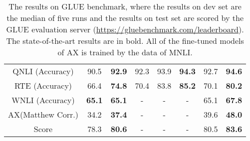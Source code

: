 \documentclass[letterpaper]{article} \usepackage{aaai20}  \usepackage{times}  \usepackage{helvet} \usepackage{courier}  \usepackage[hyphens]{url}  \usepackage{graphicx} \usepackage{makecell}
\begin{document}
\begin{table*}[htbp]
\begin{tabular}{c|cc|ccc|cc}
QNLI (Accuracy)                    & 90.5      & \textbf{92.9}                  & 92.3                     & 93.9                      & \textbf{94.3}                  & 92.7                     & \textbf{94.6}                 \\
RTE (Accuracy)                       & 66.4      & \textbf{74.8}                  & 70.4                     & 83.8                      & \textbf{85.2}                  & 70.1                     & \textbf{80.2}                 \\
WNLI (Accuracy)                      & \textbf{65.1}      & \textbf{65.1}                  & -                        & -                         & -                              & 65.1                     & \textbf{67.8}                 \\ 
AX(Matthew Corr.)           & 34.2  & \textbf{37.4}  &   - & - & -  & 39.6 & \textbf{48.0}    \\    \hline         
Score                                & 78.3      & \textbf{80.6}                  & -                        & -                         & -                              & 80.5                     & \textbf{83.6}                 \\ \hline \hline
\end{tabular}
\caption{The results on GLUE benchmark, where the results on dev set are the median of five runs and the results on test set are scored by the GLUE evaluation server (\url{https://gluebenchmark.com/leaderboard}). The state-of-the-art results are in bold. All of the fine-tuned models of AX is trained by the data of MNLI.}
\label{glue_test}
\end{table*}
\end{document}
